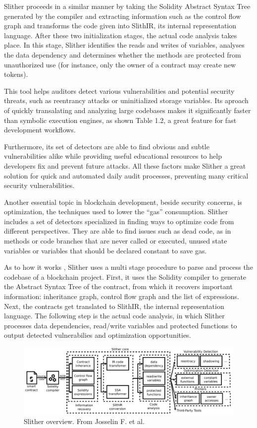 Slither \cite{slither} proceeds in a similar manner by taking the Solidity Abstract Syntax Tree generated by the compiler and extracting information such as the control flow graph and transforms the code given into SlithIR, its internal representation language. After these two initialization stages, the actual code analysis takes place. In this stage, Slither identifies the reads and writes of variables, analyses the data dependency and determines whether the methods are protected from unauthorized use (for instance, only the owner of a contract may create new tokens).

This tool \cite{slither} helps auditors detect various vulnerabilities and potential security threats, such as reentrancy attacks or uninitialized storage variables. Its aproach of quickly transalating and analyzing large codebases makes it significantly faster than symbolic execution engines, as shown Table 1.2, a great feature for fast development workflows.

Furthermore, its set of detectors are able to find obvious and subtle vulnerabilities alike while providing useful educational resources to help developers fix and prevent future attacks. All these factors make Slither a great solution for quick and automated daily audit processes, preventing many critical security vulnerabilities.

Another essential topic in blockchain development, beside security concerns, is optimization, the techniques used to lower the ``gas'' consumption. Slither includes a set of detectors specialized in finding ways to optimize code \cite{slitherGitHub} from different perspectives. They are able to find issues such as dead code, as in methods or code branches that are never called or executed, unused state variables or variables that should be declared constant to save gas.

As to how it works \cite{slither}, Slither uses a multi stage procedure to parse and process the codebase of a blockchain project. First, it uses the Solidity compiler to generate the Abstract Syntax Tree of the contract, from which it recovers important information: inheritance graph, control flow graph and the list of expressions. Next, the contracts get translated to SlithIR, the internal representation language. The following step is the actual code analysis, in which Slither processes data dependencies, read/write variables and protected functions to output detected vulnerabilies and optimization opportunities. 

\begin{figure}[h]
    \centering
    \includegraphics[width=1\linewidth]{images/image.png}
    \caption{Slither overview. From Josselin F. et al. \cite{slither}}
    \label{fig:enter-label}
\end{figure}
